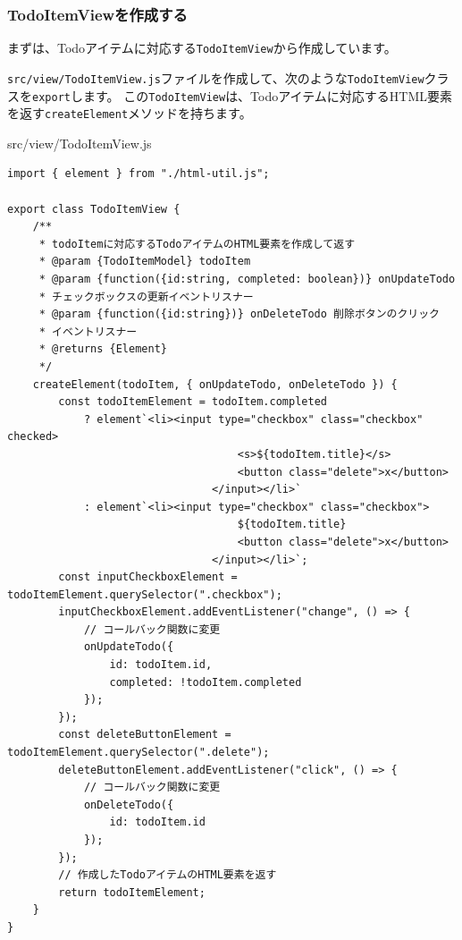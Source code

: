 \hypertarget{TodoItemView}{%
\subsubsection{TodoItemViewを作成する}\label{TodoItemView}}

まずは、Todoアイテムに対応する\texttt{TodoItemView}から作成しています。

\texttt{src/view/TodoItemView.js}ファイルを作成して、次のような\texttt{TodoItemView}クラスを\texttt{export}します。
この\texttt{TodoItemView}は、Todoアイテムに対応するHTML要素を返す\texttt{createElement}メソッドを持ちます。

\begin{listtitle}
src/view/TodoItemView.js
\end{listtitle}
\begin{lstlisting}
import { element } from "./html-util.js";

export class TodoItemView {
    /**
     * todoItemに対応するTodoアイテムのHTML要素を作成して返す
     * @param {TodoItemModel} todoItem
     * @param {function({id:string, completed: boolean})} onUpdateTodo 
     * チェックボックスの更新イベントリスナー
     * @param {function({id:string})} onDeleteTodo 削除ボタンのクリック
     * イベントリスナー
     * @returns {Element}
     */
    createElement(todoItem, { onUpdateTodo, onDeleteTodo }) {
        const todoItemElement = todoItem.completed
            ? element`<li><input type="checkbox" class="checkbox" checked>
                                    <s>${todoItem.title}</s>
                                    <button class="delete">x</button>
                                </input></li>`
            : element`<li><input type="checkbox" class="checkbox">
                                    ${todoItem.title}
                                    <button class="delete">x</button>
                                </input></li>`;
        const inputCheckboxElement = todoItemElement.querySelector(".checkbox");
        inputCheckboxElement.addEventListener("change", () => {
            // コールバック関数に変更
            onUpdateTodo({
                id: todoItem.id,
                completed: !todoItem.completed
            });
        });
        const deleteButtonElement = todoItemElement.querySelector(".delete");
        deleteButtonElement.addEventListener("click", () => {
            // コールバック関数に変更
            onDeleteTodo({
                id: todoItem.id
            });
        });
        // 作成したTodoアイテムのHTML要素を返す
        return todoItemElement;
    }
}
\end{lstlisting}
\listend

